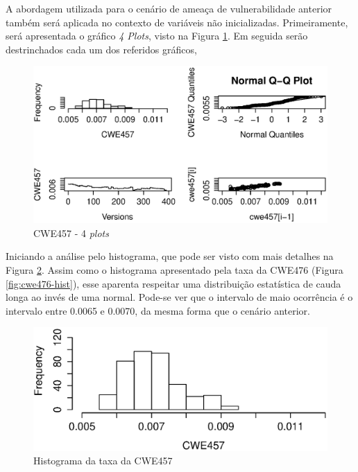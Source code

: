 A abordagem utilizada para o cenário de ameaça de vulnerabilidade anterior
também será aplicada no contexto de variáveis não inicializadas. Primeiramente,
será apresentada o gráfico \textit{4 Plots}, visto na Figura
\ref{fig:cwe457-4-plot}. Em seguida serão destrinchados cada um dos referidos
gráficos,

\begin{figure}[h]
  \centering
  \includegraphics[width=1.0\textwidth]
      {figuras/cwe457-4-plot.eps}
      \caption{CWE457 - 4 \textit{plots}}
  \label{fig:cwe457-4-plot}
\end{figure}

Iniciando a análise pelo histograma, que pode ser visto com mais detalhes na
Figura \ref{fig:cwe457-hist}. Assim como o histograma apresentado pela taxa da
CWE476 (Figura \ref{fig:cwe476-hist}), esse aparenta respeitar uma distribuição
estatística de cauda longa ao invés de uma normal. Pode-se ver que o intervalo
de maio ocorrência é o intervalo entre 0.0065 e 0.0070, da mesma forma que o
cenário anterior.

\begin{figure}[h]
  \centering
  \includegraphics[width=1.0\textwidth]
      {figuras/cwe457-hist.eps}
      \caption{Histograma da taxa da CWE457}
  \label{fig:cwe457-hist}
\end{figure}

